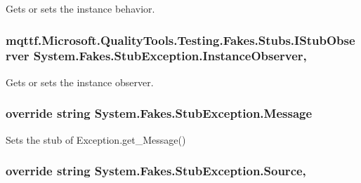 Gets or sets the instance behavior.

\hypertarget{class_system_1_1_fakes_1_1_stub_exception_a96273e3d2a663cbf194ffaa1dc2b4d1f}{
\subsubsection[{Instance\-Observer}]{\setlength{\rightskip}{0pt plus 5cm}mqttf.\-Microsoft.\-Quality\-Tools.\-Testing.\-Fakes.\-Stubs.\-I\-Stub\-Observer System.\-Fakes.\-Stub\-Exception.\-Instance\-Observer\hspace{0.3cm}{\ttfamily [get]}, {\ttfamily [set]}}}\label{class_system_1_1_fakes_1_1_stub_exception_a96273e3d2a663cbf194ffaa1dc2b4d1f}


Gets or sets the instance observer.

\hypertarget{class_system_1_1_fakes_1_1_stub_exception_af434f6eae50a863460f6052a1cce6048}{
\subsubsection[{Message}]{\setlength{\rightskip}{0pt plus 5cm}override string System.\-Fakes.\-Stub\-Exception.\-Message\hspace{0.3cm}{\ttfamily [get]}}}\label{class_system_1_1_fakes_1_1_stub_exception_af434f6eae50a863460f6052a1cce6048}


Sets the stub of Exception.\-get\-\_\-\-Message()

\hypertarget{class_system_1_1_fakes_1_1_stub_exception_a648b4d26ac133e789385c4470c6bd4fb}{
\subsubsection[{Source}]{\setlength{\rightskip}{0pt plus 5cm}override string System.\-Fakes.\-Stub\-Exception.\-Source\hspace{0.3cm}{\ttfamily [get]}, {\ttfamily [set]}}}\label{class_system_1_1_fakes_1_1_stub_exception_a648b4d26ac133e789385c4470c6bd4fb}


